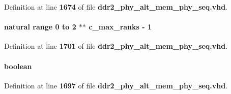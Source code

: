 Definition at line {\bf 1674} of file {\bf ddr2\+\_\+phy\+\_\+alt\+\_\+mem\+\_\+phy\+\_\+seq.\+vhd}.

\paragraph[{odt}]{ {\bfseries \textcolor{comment}{natural}\textcolor{vhdlchar}{ }\textcolor{vhdlchar}{ }\textcolor{vhdlchar}{ }\textcolor{keywordflow}{range}\textcolor{vhdlchar}{ }\textcolor{vhdlchar}{ } \textcolor{vhdldigit}{0} \textcolor{vhdlchar}{ }\textcolor{keywordflow}{to}\textcolor{vhdlchar}{ }\textcolor{vhdlchar}{ } \textcolor{vhdldigit}{2} \textcolor{vhdlchar}{$\ast$}\textcolor{vhdlchar}{$\ast$}\textcolor{vhdlchar}{ }\textcolor{vhdlchar}{ }\textcolor{vhdlchar}{ }{\bfseries {\bf c\+\_\+max\+\_\+ranks}} \textcolor{vhdlchar}{-\/}\textcolor{vhdlchar}{ } \textcolor{vhdldigit}{1} \textcolor{vhdlchar}{ }} \hspace{0.3cm}{\ttfamily [Record]}}\label{classddr2__phy__alt__mem__phy__addr__cmd__pkg_a8ea81954519c2d29ec5b0e4134ad2286}


Definition at line {\bf 1701} of file {\bf ddr2\+\_\+phy\+\_\+alt\+\_\+mem\+\_\+phy\+\_\+seq.\+vhd}.

\paragraph[{ras\+\_\+n}]{ {\bfseries \textcolor{comment}{boolean}\textcolor{vhdlchar}{ }} \hspace{0.3cm}{\ttfamily [Record]}}\label{classddr2__phy__alt__mem__phy__addr__cmd__pkg_aab0351d37b5296a4a073f9338bb4561f}


Definition at line {\bf 1697} of file {\bf ddr2\+\_\+phy\+\_\+alt\+\_\+mem\+\_\+phy\+\_\+seq.\+vhd}.

